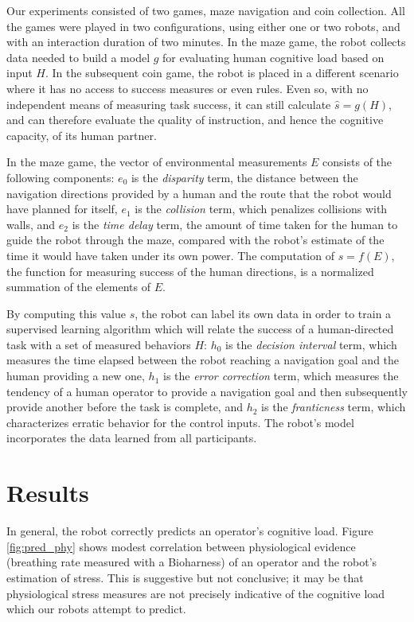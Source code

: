 \documentclass{sig-alternate-05-2015}
\begin{document}
Our experiments consisted of two games, maze navigation
\cite{crick2011human} and coin collection. All the games were played
in two configurations, using either one or two robots, and with an
interaction duration of two minutes.  In the maze game, the robot
collects data needed to build a model $g$ for evaluating human
cognitive load based on input $H$. In the subsequent coin game, the
robot is placed in a different scenario where it has no access to
success measures or even rules.  Even so, with no independent means of
measuring task success, it can still calculate $\hat{s}=g(H)$, and can
therefore evaluate the quality of instruction, and hence the cognitive
capacity, of its human partner.

In the maze game, the vector of environmental measurements $E$
consists of the following components: $e_0$ is the \emph{disparity}
term, the distance between the navigation directions provided by a
human and the route that the robot would have planned for itself,
$e_1$ is the \emph{collision} term, which penalizes collisions with
walls, and $e_2$ is the \emph{time delay} term, the amount of time
taken for the human to guide the robot through the maze, compared with
the robot's estimate of the time it would have taken under its own
power. The computation of $s = f(E)$, the function for measuring
success of the human directions, is a normalized summation of the
elements of $E$.

By computing this value $s$, the robot can label its own data in order
to train a supervised learning algorithm which will relate the success
of a human-directed task with a set of measured behaviors $H$: $h_0$
is the \emph{decision interval} term, which measures the time elapsed
between the robot reaching a navigation goal and the human providing a
new one, $h_1$ is the \emph{error correction} term, which measures the
tendency of a human operator to provide a navigation goal and then
subsequently provide another before the task is complete, and $h_2$ is
the \emph{franticness} term, which characterizes erratic behavior for
the control inputs. The robot's model incorporates the data learned
from all participants.

\section{Results}

In general, the robot correctly predicts an operator's cognitive
load. Figure \ref{fig:pred_phy} shows modest correlation between
physiological evidence (breathing rate measured with a Bioharness) of
an operator and the robot's estimation of stress. This is suggestive
but not conclusive; it may be that physiological stress measures are
not precisely indicative of the cognitive load which our robots
attempt to predict.
\end{document}
